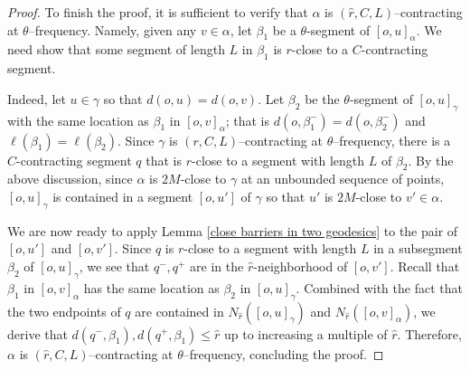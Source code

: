 \documentclass{amsart}
\newtheorem{lem}[thm]{Lemma}
\theoremstyle{definition}
\newtheorem{defn}[thm]{Definition}
\theoremstyle{remark}
\newcommand{\RR}{\mathbb{R}}
\newcommand{\from}{\colon\thinspace}
\newcommand{\thick}{\ensuremath{\operatorname{thick}}\xspace}
\newcommand{\param}{{\mathchoice{\mkern1mu\mbox{\raise2.2pt\hbox{$
  \centerdot$}}
  \mkern1mu}{\mkern1mu\mbox{\raise2.2pt\hbox{$\centerdot$}}\mkern1mu}{
  \mkern1.5mu\centerdot\mkern1.5mu}{\mkern1.5mu\centerdot\mkern1.5mu}}}
\begin{document}
\begin{proof}
To finish the proof, it is sufficient to verify that $\alpha$ is $(\hat r, C, L)$--contracting   at $\theta$–frequency. 
Namely, given any $v\in \alpha$, let $\beta_1$ be a   $\theta$-segment of $[o,u]_\alpha$. We need show that some segment of length $L$  in $\beta_1$ is $r$-close to a $C$-contracting segment. 

Indeed, let $u\in \gamma$  so that $d(o,u)=d(o,v)$.    Let $\beta_2$ be the $\theta$-segment of $[o,u]_\gamma$ with the same location as $\beta_1$ in $[o,v]_\alpha$; that is $d(o,\beta_1^-)=d(o,\beta_2^-)$ and $\ell(\beta_1)=\ell(\beta_2)$.  Since $\gamma$ is $( r, C, L)$--contracting   at $\theta$–frequency, there is a $C$-contracting segment $q$ that is $r$-close to  a segment with length $L$ of $\beta_2$. By the above discussion, since $\alpha$ is $2M$-close to  $\gamma$ at an unbounded sequence of points,  $[o,u]_\gamma$ is contained in a segment $[o,u']$ of $\gamma$ so that $u'$ is $2M$-close to $v'\in \alpha$.    

We are now ready to apply  Lemma \ref{close barriers in two geodesics} to the pair of $[o,u']$ and $[o,v']$. Since $q$ is $r$-close to a segment with length $L$ in a subsegment $\beta_2$ of  $[o,u]_\gamma$, we see that  $q^-,q^+$ are in the $\hat r$-neighborhood of $[o,v']$. Recall that $\beta_1$ in $[o,v]_\alpha$ has the same location as $\beta_2$ in $[o,u]_\gamma$. Combined with the fact that the two endpoints of $q$ are contained in $N_{\hat r}([o,u]_\gamma)$ and $N_{\hat r}([o,v]_\alpha)$, we derive that $d(q^-,\beta_1),d(q^+,\beta_1)\le \hat r$ up to increasing a multiple of $\hat r$. Therefore,  $\alpha$ is $(\hat r, C, L)$--contracting   at $\theta$–frequency, concluding the proof.
\end{proof}

\end{document}
